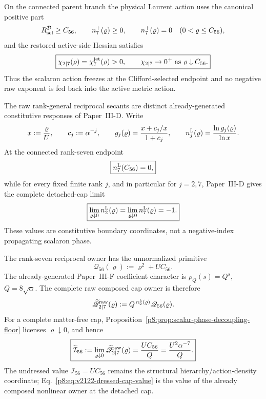 \documentclass[12pt,a4paper]{article}
\begin{document}



\begin{theorem}
\label{p8:lem:terminal-mass-freezes-scalaron-not-index}
\label{p8:thm:v2111-detached-raw-laurent-limit}
On the connected parent branch the physical Laurent action uses the canonical
positive part
\[
 R_{\rm sel}^{\mathcal D}\ge C_{56},
 \qquad
 n_7^+(\varrho)\ge0,
 \qquad
 n_7^+(\varrho)=0\quad(0<\varrho\le C_{56}),
\]
and the restored active-side Hessian satisfies
\[
 \boxed{\chi_{2\mid7}(\varrho)=\chi_7^{\rm jet}(\varrho)>0,
 \qquad \chi_{2\mid7}\to0^+\ \text{as}\ \varrho\downarrow C_{56}.}
\]
Thus the scalaron action freezes at the Clifford-selected endpoint and no
negative raw exponent is fed back into the active metric action.

The raw rank-general reciprocal secants are distinct already-generated
constitutive responses of Paper~III-D.  Write
\[
 x:=\frac{\varrho}{U},\qquad c_j:=\alpha^{-j},\qquad
 g_j(\varrho)=\frac{x+c_j/x}{1+c_j},\qquad
 n_j^{\rm L}(\varrho)=\frac{\ln g_j(\varrho)}{\ln x}.
\]
At the connected rank-seven endpoint
\[
 \boxed{n_7^{\rm L}(C_{56})=0,}
\]
while for every fixed finite rank \(j\), and in particular for \(j=2,7\),
Paper~III-D gives the complete detached-cap limit
\begin{equation}
\label{p8:eq:v2122-detached-raw-pair-minus-one}
 \boxed{
 \lim_{\varrho\downarrow0}n_2^{\rm L}(\varrho)
 =\lim_{\varrho\downarrow0}n_7^{\rm L}(\varrho)=-1.}
\end{equation}
These values are constitutive boundary coordinates, not a negative-index
propagating scalaron phase.

The rank-seven reciprocal owner has the unnormalized primitive
\begin{equation}
\label{p8:eq:v2111-terminal-born-primitive}
 \mathscr Q_{56}(\varrho):=\varrho^2+UC_{56}.
\end{equation}
The already-generated Paper~III-F coefficient character is
\(\rho_Q(s)=Q^s\), \(Q=8\sqrt\alpha\).  The complete raw composed cap owner is
therefore
\begin{equation}
\label{p8:eq:v2122-dressed-cap-owner}
 \widetilde{\mathscr Q}_{2\mid7}^{\rm raw}(\varrho)
 :=Q^{\,n_2^{\rm L}(\varrho)}\mathscr Q_{56}(\varrho).
\end{equation}
For a complete matter-free cap, Proposition~\ref{p8:prop:scalar-phase-decoupling-floor}
licenses \(\varrho\downarrow0\), and hence
\begin{equation}
\label{p8:eq:v2122-dressed-cap-value}
 \boxed{
 \widetilde{\mathcal I}_{56}
 :=\lim_{\varrho\downarrow0}
 \widetilde{\mathscr Q}_{2\mid7}^{\rm raw}(\varrho)
 =\frac{UC_{56}}{Q}
 =\frac{U^2\alpha^{-7}}{Q}.}
\end{equation}
The undressed value \(\mathcal I_{56}=UC_{56}\) remains the structural
hierarchy/action-density coordinate; Eq.~\eqref{p8:eq:v2122-dressed-cap-value}
is the value of the already composed nonlinear owner at the detached cap.
\end{theorem}
\end{document}
